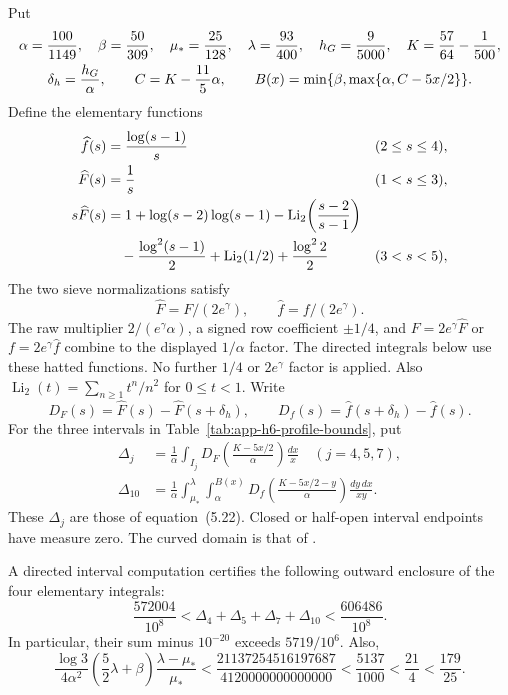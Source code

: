 Put
\begin{gather}
 \alpha=\frac{100}{1149},\quad \beta=\frac{50}{309},\quad
 \mu_* =\frac{25}{128},\quad \lambda=\frac{93}{400},\quad
 h_G=\frac9{5000},\quad K=\frac{57}{64}-\frac1{500},\notag\\
 \delta_h=\frac {h_G}\alpha,\qquad C=K-\frac{11}{5}\alpha,\qquad
 B(x)=\min\{\beta,\max\{\alpha,C-5x/2\}\}.
 \label{eq:app-h6-profile-parameters}
\end{gather}
Define the elementary functions
\begin{align}
 \widehat f(s)&=\frac{\log(s-1)}s &&(2\le s\le4),\notag\\
 \widehat F(s)&=\frac1s &&(1<s\le3),\label{eq:app-h6-profile-functions}\\
 s\widehat F(s)&=1+\log(s-2)\log(s-1)
 -\operatorname{Li}_2\!\left(\frac{s-2}{s-1}\right)\\
 &\quad-\frac{\log^2(s-1)}2+\operatorname{Li}_2(1/2)
 +\frac{\log^22}{2} &&(3<s<5),\notag
\end{align}
The two sieve normalizations satisfy
\[
 \widehat F=F/(2e^\gamma),\qquad \widehat f=f/(2e^\gamma).
\]
The raw multiplier $2/(e^\gamma\alpha)$, a signed row coefficient
$\pm1/4$, and $F=2e^\gamma\widehat F$ or
$f=2e^\gamma\widehat f$ combine to the displayed $1/\alpha$ factor.
The directed integrals below use these hatted functions. No further $1/4$ or
$2e^\gamma$ factor is applied.
Also $\operatorname{Li}_2(t)=\sum_{n\ge1}t^n/n^2$ for $0\le t<1$.
Write
\[
 D_F(s)=\widehat F(s)-\widehat F(s+\delta_h),\qquad
 D_f(s)=\widehat f(s+\delta_h)-\widehat f(s).
\]
For the three intervals in Table~\ref{tab:app-h6-profile-bounds}, put
\begin{align}
 \Delta_j&=\frac1\alpha\int_{I_j}
 D_F\!\left(\frac{K-5x/2}{\alpha}\right)\frac{dx}{x}
 \quad(j=4,5,7),\label{eq:app-h6-profile-negative}\\
 \Delta_{10}&=\frac1\alpha\int_{\mu_*}^\lambda\int_\alpha^{B(x)}
 D_f\!\left(\frac{K-5x/2-y}{\alpha}\right)
 \frac{dy\,dx}{xy}.
 \label{eq:app-h6-profile-positive}
\end{align}
These $\Delta_j$ are those of
equation~(5.22).
Closed or half-open interval endpoints have measure zero.
The curved domain is that of \cite[(2.38)--(2.40)]{PaperII}.

\begin{proposition}\label{prop:app-h6-four-profiles}
A directed interval computation certifies the following outward enclosure of the
four elementary integrals:
\begin{equation}\label{eq:app-h6-profile-total}
 \frac{572004}{10^8}<\Delta_4+\Delta_5+\Delta_7+\Delta_{10}
 <\frac{606486}{10^8}.
\end{equation}
In particular, their sum minus $10^{-20}$ exceeds $5719/10^6$.
Also,
\begin{equation}\label{eq:app-h6-profile-strip}
 \frac{\log3}{4\alpha^2}
 \left(\frac52\lambda+\beta\right)\frac{\lambda-\mu_*}{\mu_*}
 <\frac{21137254516197687}{4120000000000000}
 <\frac{5137}{1000}<\frac{21}{4}<\frac{179}{25}.
\end{equation}
\end{proposition}

